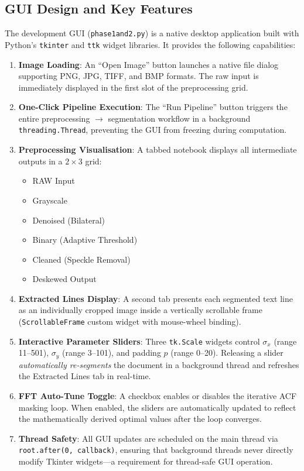 \documentclass[12pt, a4paper]{article}
\begin{document}
\subsection{GUI Design and Key Features}

The development GUI (\texttt{phase1and2.py}) is a native desktop application built with Python's \texttt{tkinter} and \texttt{ttk} widget libraries. It provides the following capabilities:

\begin{enumerate}
    \item \textbf{Image Loading}: An ``Open Image'' button launches a native file dialog supporting PNG, JPG, TIFF, and BMP formats. The raw input is immediately displayed in the first slot of the preprocessing grid.

    \item \textbf{One-Click Pipeline Execution}: The ``Run Pipeline'' button triggers the entire preprocessing $\rightarrow$ segmentation workflow in a background \texttt{threading.Thread}, preventing the GUI from freezing during computation.

    \item \textbf{Preprocessing Visualisation}: A tabbed notebook displays all intermediate outputs in a $2 \times 3$ grid:
    \begin{itemize}
        \item[1.] RAW Input
        \item[2.] Grayscale
        \item[3.] Denoised (Bilateral)
        \item[4.] Binary (Adaptive Threshold)
        \item[5.] Cleaned (Speckle Removal)
        \item[6.] Deskewed Output
    \end{itemize}

    \item \textbf{Extracted Lines Display}: A second tab presents each segmented text line as an individually cropped image inside a vertically scrollable frame (\texttt{ScrollableFrame} custom widget with mouse-wheel binding).

    \item \textbf{Interactive Parameter Sliders}: Three \texttt{tk.Scale} widgets control $\sigma_x$ (range 11--501), $\sigma_y$ (range 3--101), and padding $p$ (range 0--20). Releasing a slider \emph{automatically re-segments} the document in a background thread and refreshes the Extracted Lines tab in real-time.

    \item \textbf{FFT Auto-Tune Toggle}: A checkbox enables or disables the iterative ACF masking loop. When enabled, the sliders are automatically updated to reflect the mathematically derived optimal values after the loop converges.

    \item \textbf{Thread Safety}: All GUI updates are scheduled on the main thread via \texttt{root.after(0, callback)}, ensuring that background threads never directly modify Tkinter widgets---a requirement for thread-safe GUI operation.
\end{enumerate}
\end{document}
